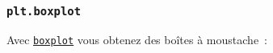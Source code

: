     \begin{center}
    \end{center}
    { \hspace*{\fill} \\}
    
    \hypertarget{plt.boxplot}{%
\subsubsection{\texorpdfstring{\texttt{plt.boxplot}}{plt.boxplot}}\label{plt.boxplot}}

    Avec
\href{https://matplotlib.org/api/_as_gen/matplotlib.pyplot.boxplot.html}{\texttt{boxplot}}
vous obtenez des boîtes à moustache~:

